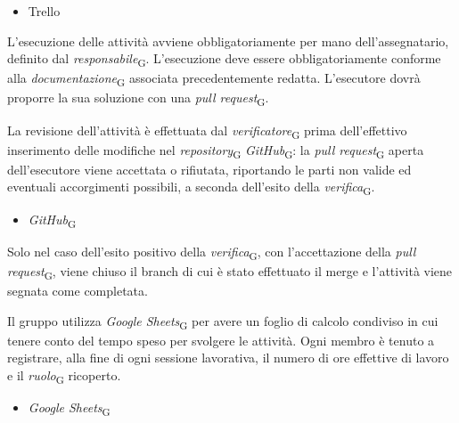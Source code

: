     \begin{itemize}
        \item Trello
    \end{itemize}

L'esecuzione delle attività avviene obbligatoriamente per mano dell'assegnatario, definito dal \textit{responsabile}\textsubscript{G}. L'esecuzione deve essere obbligatoriamente conforme alla \textit{documentazione}\textsubscript{G} associata precedentemente redatta. L'esecutore dovrà proporre la sua soluzione con una \textit{pull request}\textsubscript{G}.

La revisione dell'attività è effettuata dal \textit{verificatore}\textsubscript{G} prima dell'effettivo inserimento delle modifiche nel \textit{repository}\textsubscript{G} \textit{GitHub}\textsubscript{G}: la \textit{pull request}\textsubscript{G} aperta dell'esecutore viene accettata o rifiutata, riportando le parti non valide ed eventuali accorgimenti possibili, a seconda dell'esito della \textit{verifica}\textsubscript{G}.
    \begin{itemize}
        \item \textit{GitHub}\textsubscript{G}
    \end{itemize}

Solo nel caso dell'esito positivo della \textit{verifica}\textsubscript{G}, con l'accettazione della \textit{pull request}\textsubscript{G}, viene chiuso il branch di cui è stato effettuato il merge e l'attività viene segnata come completata. 

Il gruppo utilizza \textit{Google Sheets}\textsubscript{G} per avere un foglio di calcolo condiviso in cui tenere conto del tempo speso per svolgere le attività. Ogni membro è tenuto a registrare, alla fine di ogni sessione lavorativa, il numero di ore effettive di lavoro e il \textit{ruolo}\textsubscript{G} ricoperto.
    \begin{itemize}
        \item \textit{Google Sheets}\textsubscript{G}
    \end{itemize}


